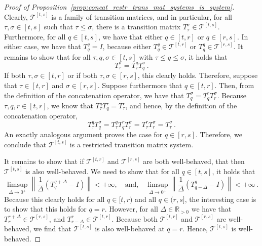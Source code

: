 \documentclass[10pt]{paper}
\theoremstyle{definition}
\newcommand{\reals}{\mathbb{R}}
\newcommand{\realspos}{\reals_{>0}}
\newcommand{\norm}[1]{\left\lVert #1 \right\rVert}
\begin{document}
\begin{proof}[Proof of Proposition~\ref{prop:concat_restr_trans_mat_systems_is_system}]
Clearly, $\mathcal{T}^{[t,s]}$ is a family of transition matrices, and in particular, for all $\tau,\sigma\in[t,s]$ such that $\tau\leq \sigma$, there is a transition matrix $T_\tau^\sigma\in\mathcal{T}^{[t,s]}$. Furthermore, for all $q\in[t,s]$, we have that either $q\in[t,r]$ or $q\in[r,s]$. In either case, we have that $T_q^q=I$, because either $T_q^q\in\mathcal{T}^{[t,r]}$ or $T_q^q\in\mathcal{T}^{[r,s]}$. It remains to show that for all $\tau,q,\sigma\in[t,s]$ with $\tau\leq q\leq\sigma$, it holds that
\begin{equation*}
T_\tau^\sigma = T_\tau^qT_q^\sigma\,.
\end{equation*}
If both $\tau,\sigma\in[t,r]$ or if both $\tau,\sigma\in[r,s]$, this clearly holds. Therefore, suppose that $\tau\in[t,r]$ and $\sigma\in[r,s]$. Suppose furthermore that $q\in[t,r]$. Then, from the definition of the concatenation operator, we have that $T_q^\sigma=T_q^rT_r^\sigma$. Because $\tau,q,r\in[t,r]$, we know that $T_\tau^qT_q^r=T_\tau^r$, and hence, by the definition of the concatenation operator,
\begin{equation*}
T_\tau^qT_q^\sigma = T_\tau^qT_q^rT_r^\sigma = T_\tau^rT_r^\sigma = T_\tau^\sigma\,.
\end{equation*}
An exactly analogous argument proves the case for $q\in[r,s]$. Therefore, we conclude that $\mathcal{T}^{[t,s]}$ is a restricted transition matrix system.

It remains to show that if $\mathcal{T}^{[t,r]}$ and $\mathcal{T}^{[r,s]}$ are both well-behaved, that then $\mathcal{T}^{[t,s]}$ is also well-behaved. We need to show that for all $q\in[t,s]$, it holds that
\begin{equation*}
\limsup_{\Delta\to0^+}\norm{\frac{1}{\Delta}\left(T_q^{q+\Delta} - I\right)} < +\infty,\quad\text{and,}\quad \limsup_{\Delta\to0^+}\norm{\frac{1}{\Delta}\left(T_{q-\Delta}^{q} - I\right)} < +\infty\,.
\end{equation*}
Because this clearly holds for all $q\in[t,r)$ and all $q\in(r,s]$, the interesting case is to show that this holds for $q=r$. However, for all $\Delta\in\realspos$ we have that $T_r^{r+\Delta}\in\mathcal{T}^{[r,s]}$, and $T_{r-\Delta}^{r}\in\mathcal{T}^{[t,r]}$. Because both $\mathcal{T}^{[t,r]}$ and $\mathcal{T}^{[r,s]}$ are well-behaved, we find that $\mathcal{T}^{[t,s]}$ is also well-behaved at $q=r$. Hence, $\mathcal{T}^{[t,s]}$ is well-behaved.
\end{proof}
\end{document}

